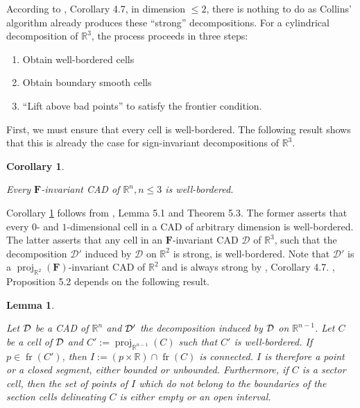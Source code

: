 \documentclass[
]{book}
\providecommand{\tightlist}{%
  \setlength{\itemsep}{0pt}\setlength{\parskip}{0pt}}
\newtheorem{lemma}{Lemma}[chapter]
\newtheorem{corollary}{Corollary}[chapter]
\theoremstyle{definition}
\theoremstyle{definition}
\theoremstyle{definition}
\theoremstyle{definition}
\theoremstyle{remark}
\begin{document}
According to \citet{lazard10}, Corollary 4.7, in dimension \(\le 2\), there is nothing to do as Collins' algorithm already produces these ``strong'' decompositions.
For a cylindrical decomposition of \(\mathbb{R}^3\), the process proceeds in three steps:

\begin{enumerate}
\def\labelenumi{\arabic{enumi}.}
\tightlist
\item
  Obtain well-bordered cells
\item
  Obtain boundary smooth cells
\item
  ``Lift above bad points'' to satisfy the frontier condition.
\end{enumerate}

First, we must ensure that every cell is well-bordered. The following result shows that this is already the case for sign-invariant decompositions of \(\mathbb{R}^3\).

\begin{corollary}
\protect\hypertarget{cor:lazard-5-4}{}\label{cor:lazard-5-4}\citep[Corollary 5.4]{lazard10}

Every \(\mathbf{F}\)-invariant CAD of \(\mathbb{R}^n, n \le 3\) is well-bordered.
\end{corollary}

Corollary \ref{cor:lazard-5-4} follows from \citet{lazard10}, Lemma 5.1 and Theorem 5.3.
The former asserts that every \(0\)- and \(1\)-dimensional cell in a CAD of arbitrary dimension is well-bordered.
The latter asserts that any cell in an \(\mathbf{F}\)-invariant CAD \(\mathcal{D}\) of \(\mathbb{R}^3\), such that the decomposition \(\mathcal{D}'\) induced by \(\mathcal{D}\) on \(\mathbb{R}^2\) is strong, is well-bordered.
Note that \(\mathcal{D}'\) is a \({\operatorname{proj}_{\mathbb{R}^{2}}}(\mathbf{F})\)-invariant CAD of \(\mathbb{R}^2\) and is always strong by \citet{lazard10}, Corollary 4.7.
\citet{lazard10}, Proposition 5.2 depends on the following result.

\begin{lemma}
\protect\hypertarget{lem:lazard-5-2}{}\label{lem:lazard-5-2}\citep[Proposition 5,2]{lazard10}

Let \(\cal D\) be a CAD of \(\mathbb{R}^n\) and \(\cal D'\) the decomposition induced by \(\cal D\) on \(\mathbb{R}^{n-1}\). Let \(C\) be a cell of \(\cal D\) and \(C' := {\operatorname{proj}_{\mathbb{R}^{n-1}}} (C)\) such that \(C'\) is well-bordered.
If \(p \in {\operatorname{fr} \left( C' \right)}\), then \(I := (p \times \mathbb{R}) \cap {\operatorname{fr} \left( C \right)}\) is connected.
\(I\) is therefore a point or a closed segment, either bounded or unbounded.
Furthermore, if \(C\) is a sector cell, then the set of points of \(I\) which do not belong to the boundaries of the section cells delineating \(C\) is either empty or an open interval.
\end{lemma}
\end{document}
